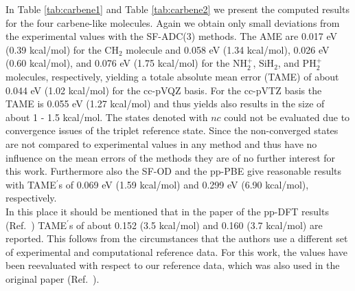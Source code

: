 \documentclass[aip,graphicx,amsmath,reprint]{revtex4-1}
\begin{document}
In Table \ref{tab:carbene1} and Table \ref{tab:carbene2} we present the computed results for the four  carbene-like molecules. Again we obtain only small deviations from the experimental values with the SF-ADC(3) methods. The AME are  0.017 eV (0.39 kcal/mol) for the CH$_2$ molecule and 0.058 eV (1.34 kcal/mol), 0.026 eV (0.60 kcal/mol), and 0.076 eV (1.75 kcal/mol) for the NH$_2^+$, SiH$_2$, and PH$_2^+$ molecules, respectively, yielding a totale absolute mean error (TAME) of about 0.044 eV (1.02 kcal/mol) for the cc-pVQZ basis. For the cc-pVTZ basis the TAME is 0.055 eV (1.27 kcal/mol) and thus yields also results in the size of about 1 - 1.5 kcal/mol.  The states denoted with $nc$ could not be evaluated due to convergence issues of the triplet reference state. Since the non-converged states are not compared to experimental values in any method and thus have no influence on the mean errors of the methods they are of no further interest for this work. Furthermore also the SF-OD and the pp-PBE give reasonable results with TAME$^\prime$s of 0.069 eV (1.59 kcal/mol) and 0.299 eV (6.90 kcal/mol), respectively. \\In this place it should be mentioned that in the paper of the pp-DFT results (Ref.~) TAME$^\prime$s of about 0.152 (3.5 kcal/mol) and 0.160 (3.7 kcal/mol) are reported. This follows from the circumstances that the authors use a different set of experimental and computational reference data. For this work, the values have been reevaluated with respect to our reference data, which was also used in the original paper (Ref.~).\\
\end{document}
